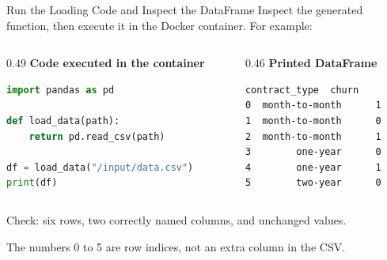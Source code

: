 \documentclass[aspectratio=169]{beamer}
\begin{document}
\begin{frame}[fragile]{Run the Loading Code and Inspect the DataFrame}
  \small Inspect the generated function, then execute it in the Docker container. For example:
  \par\vspace{0.5em}
  \begin{columns}[T,onlytextwidth]
    \begin{column}{0.49\linewidth}
      \textbf{Code executed in the container}
\begin{lstlisting}[language=Python]
import pandas as pd

def load_data(path):
    return pd.read_csv(path)

df = load_data("/input/data.csv")
print(df)
\end{lstlisting}
    \end{column}
    \begin{column}{0.46\linewidth}
      \textbf{Printed DataFrame}
\begin{lstlisting}[language={},columns=fullflexible]
    contract_type  churn
0  month-to-month      1
1  month-to-month      0
2  month-to-month      1
3        one-year      0
4        one-year      1
5        two-year      0
\end{lstlisting}
    \end{column}
  \end{columns}
  \par\vspace{0.6em}
  \small Check: six rows, two correctly named columns, and unchanged values.
  \par\vspace{0.4em}
  The numbers 0 to 5 are row indices, not an extra column in the CSV.
\end{frame}
\end{document}
